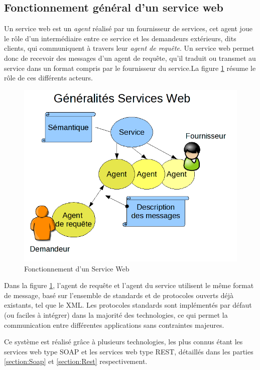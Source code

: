 \subsection{Fonctionnement général d'un service web}
Un service web est un \emph{agent} réalisé par un fournisseur de services, cet agent joue le rôle d'un intermédiaire entre ce service et les demandeurs extérieurs, dits clients, qui communiquent à travers leur \emph{agent de requête}. 
\newline			
Un service web permet donc de recevoir des messages d'un agent de requête, qu'il traduit ou transmet au service dans un format compris par le fournisseur du service.\newline La figure \ref{Generalite_figure} résume le rôle de ces différents acteurs.
\begin{figure}[h]
	\center
	\includegraphics[scale=0.5]{img/Whatisaserviceweb.png}
	\caption{Fonctionnement d'un Service Web}		
	\label{Generalite_figure}
\end{figure}						
\newline
Dans la figure \ref{Generalite_figure}, l'agent de requête et l'agent du service utilisent le même format de message, basé sur l'ensemble de standards et de protocoles ouverts déjà existants, tel que le XML.
Les protocoles standards sont implémentés par défaut (ou faciles à intégrer) dans la majorité des technologies, ce qui permet la communication entre différentes applications sans contraintes majeures. 
	
Ce système est réalisé grâce à plusieurs technologies, les plus connus étant les services web type SOAP et les services web type REST, détaillés dans les parties \ref{section:Soap} et \ref{section:Rest} respectivement.
	

